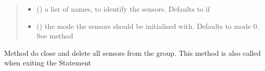 \documentclass[letterpaper,10pt,english]{sphinxmanual}
\begin{document}
\begin{fulllineitems}
\begin{quote}
\begin{description}
\begin{itemize}
\item {} 
 (\sphinxstyleliteralemphasis{\sphinxupquote{{[}}}\sphinxstyleliteralemphasis{\sphinxupquote{{[}}}\sphinxstyleliteralemphasis{\sphinxupquote{{]}}}\sphinxstyleliteralemphasis{\sphinxupquote{, }}\sphinxstyleliteralemphasis{\sphinxupquote{{]}}}) \textendash{} a list of names, to identify the sensors. Defaults to  if 

\item {} 
 () \textendash{} the mode the sensors should be initialised with. Defaults to mode 0. See {\hyperref[\detokenize{sensor:lib.sensor.Sensor.configure}]{}} method

\end{itemize}

\end{description}\end{quote}

\begin{fulllineitems}
\label{\detokenize{sensor:lib.sensor.SensorGroup.close}}
Method do close and delete all sensors from the group. This method is also called when exiting the \sphinxhyphen{}Statement

\end{fulllineitems}



\end{fulllineitems}
\end{document}
